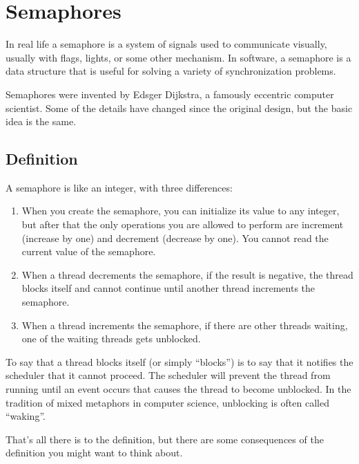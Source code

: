 \documentclass{book}
\newcommand{\clearemptydoublepage}{\newpage\cleardoublepage}
\begin{document}
\clearemptydoublepage
\chapter{Semaphores}

In real life a semaphore is a system of signals used to communicate
visually, usually with flags, lights, or some other mechanism.  In
software, a semaphore is a data structure that is useful for solving a
variety of synchronization problems.

Semaphores were invented by Edsger Dijkstra, a famously eccentric
computer scientist.  Some of the details have changed since the
original design, but the basic idea is the same.

\section{Definition}

A semaphore is like an integer, with three differences:

\begin{enumerate}

\item When you create the semaphore, you can initialize its value to
any integer, but after that the only operations you are allowed to
perform are increment (increase by one) and decrement (decrease by
one).  You cannot read the current value of the semaphore.

\item When a thread decrements the semaphore, if the result is
negative, the thread blocks itself and cannot continue until another
thread increments the semaphore.

\item When a thread increments the semaphore, if there are other
threads waiting, one of the waiting threads gets unblocked.

\end{enumerate}

To say that a thread blocks itself (or simply ``blocks'') is to say
that it notifies the scheduler that it cannot proceed.  The scheduler
will prevent the thread from running until an event occurs that causes
the thread to become unblocked.  In the tradition of mixed metaphors
in computer science, unblocking is often called ``waking''.

That's all there is to the definition, but there are some
consequences of the definition you might want to think about.
\end{document}
